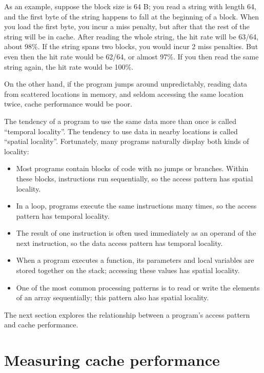 \documentclass[12pt]{book}
\begin{document}
As an example, suppose the block size is 64 B;
you read a string with length 64, and the first
byte of the string happens to fall at the beginning of a block.  When
you load the first byte, you incur a miss penalty, but
after that the rest of the string will be in cache.  After
reading the whole string, the hit rate will be 63/64, about 98\%.
If the string spans two blocks, you would incur 2 miss penalties.  But
even then the hit rate would be 62/64, or almost 97\%.  If you then
read the same string again, the hit rate would be 100\%.

On the other hand, if the program jumps around unpredictably,
reading data from scattered locations in memory, and seldom
accessing the same location twice, cache performance would be
poor.

The tendency of a program to use the same data more than once is
called ``temporal locality''.  The tendency to use data in nearby
locations is called ``spatial locality''.  Fortunately, many
programs naturally display both kinds of locality:

\begin{itemize}

\item Most programs contain blocks of code with no jumps or
branches.  Within these blocks, instructions run
sequentially, so the access pattern has
spatial locality.

\item In a loop, programs execute the same instructions many
times, so the access pattern has temporal locality.

\item The result of one instruction is often used immediately as
an operand of the next instruction, so the data access pattern
has temporal locality.

\item When a program executes a function, its parameters and local
variables are stored together on the stack; accessing these values
has spatial locality.

\item One of the most common processing patterns is to read or write
the elements of an array sequentially; this pattern also has
spatial locality.

\end{itemize}

The next section explores the relationship
between a program's access pattern and cache performance.


\section{Measuring cache performance}
\end{document}
